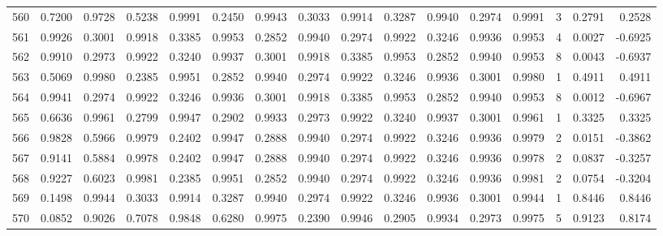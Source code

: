 \begin{tabular}{lrrrrrrrrrrrrrrr}
560 &      0.7200 &  0.9728 &  0.5238 &  0.9991 &  0.2450 &  0.9943 &  0.3033 &  0.9914 &  0.3287 &  0.9940 &   0.2974 &     0.9991 &      3 &                    0.2791 &                     0.2528 \\
561 &      0.9926 &  0.3001 &  0.9918 &  0.3385 &  0.9953 &  0.2852 &  0.9940 &  0.2974 &  0.9922 &  0.3246 &   0.9936 &     0.9953 &      4 &                    0.0027 &                    -0.6925 \\
562 &      0.9910 &  0.2973 &  0.9922 &  0.3240 &  0.9937 &  0.3001 &  0.9918 &  0.3385 &  0.9953 &  0.2852 &   0.9940 &     0.9953 &      8 &                    0.0043 &                    -0.6937 \\
563 &      0.5069 &  0.9980 &  0.2385 &  0.9951 &  0.2852 &  0.9940 &  0.2974 &  0.9922 &  0.3246 &  0.9936 &   0.3001 &     0.9980 &      1 &                    0.4911 &                     0.4911 \\
564 &      0.9941 &  0.2974 &  0.9922 &  0.3246 &  0.9936 &  0.3001 &  0.9918 &  0.3385 &  0.9953 &  0.2852 &   0.9940 &     0.9953 &      8 &                    0.0012 &                    -0.6967 \\
565 &      0.6636 &  0.9961 &  0.2799 &  0.9947 &  0.2902 &  0.9933 &  0.2973 &  0.9922 &  0.3240 &  0.9937 &   0.3001 &     0.9961 &      1 &                    0.3325 &                     0.3325 \\
566 &      0.9828 &  0.5966 &  0.9979 &  0.2402 &  0.9947 &  0.2888 &  0.9940 &  0.2974 &  0.9922 &  0.3246 &   0.9936 &     0.9979 &      2 &                    0.0151 &                    -0.3862 \\
567 &      0.9141 &  0.5884 &  0.9978 &  0.2402 &  0.9947 &  0.2888 &  0.9940 &  0.2974 &  0.9922 &  0.3246 &   0.9936 &     0.9978 &      2 &                    0.0837 &                    -0.3257 \\
568 &      0.9227 &  0.6023 &  0.9981 &  0.2385 &  0.9951 &  0.2852 &  0.9940 &  0.2974 &  0.9922 &  0.3246 &   0.9936 &     0.9981 &      2 &                    0.0754 &                    -0.3204 \\
569 &      0.1498 &  0.9944 &  0.3033 &  0.9914 &  0.3287 &  0.9940 &  0.2974 &  0.9922 &  0.3246 &  0.9936 &   0.3001 &     0.9944 &      1 &                    0.8446 &                     0.8446 \\
570 &      0.0852 &  0.9026 &  0.7078 &  0.9848 &  0.6280 &  0.9975 &  0.2390 &  0.9946 &  0.2905 &  0.9934 &   0.2973 &     0.9975 &      5 &                    0.9123 &                     0.8174 \\

\end{tabular}
